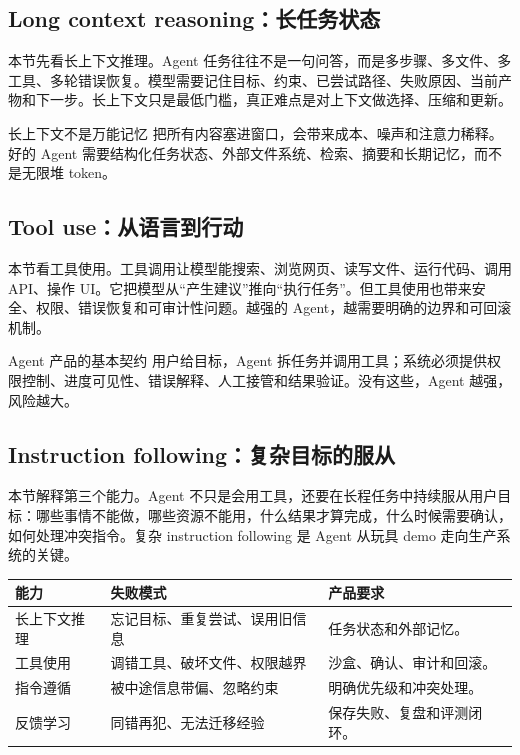 \documentclass[a4paper]{article}
\begin{document}
\subsection{Long context reasoning：长任务状态}

本节先看长上下文推理。Agent 任务往往不是一句问答，而是多步骤、多文件、多工具、多轮错误恢复。模型需要记住目标、约束、已尝试路径、失败原因、当前产物和下一步。长上下文只是最低门槛，真正难点是对上下文做选择、压缩和更新。

\begin{warningbox}{长上下文不是万能记忆}
把所有内容塞进窗口，会带来成本、噪声和注意力稀释。好的 Agent 需要结构化任务状态、外部文件系统、检索、摘要和长期记忆，而不是无限堆 token。
\end{warningbox}

\subsection{Tool use：从语言到行动}

本节看工具使用。工具调用让模型能搜索、浏览网页、读写文件、运行代码、调用 API、操作 UI。它把模型从“产生建议”推向“执行任务”。但工具使用也带来安全、权限、错误恢复和可审计性问题。越强的 Agent，越需要明确的边界和可回滚机制。

\begin{importantbox}{Agent 产品的基本契约}
用户给目标，Agent 拆任务并调用工具；系统必须提供权限控制、进度可见性、错误解释、人工接管和结果验证。没有这些，Agent 越强，风险越大。
\end{importantbox}

\subsection{Instruction following：复杂目标的服从}

本节解释第三个能力。Agent 不只是会用工具，还要在长程任务中持续服从用户目标：哪些事情不能做，哪些资源不能用，什么结果才算完成，什么时候需要确认，如何处理冲突指令。复杂 instruction following 是 Agent 从玩具 demo 走向生产系统的关键。

\noindent\begin{tabularx}{\textwidth}{p{}p{}X}
\toprule
能力 & 失败模式 & 产品要求 \\
\midrule
长上下文推理 & 忘记目标、重复尝试、误用旧信息 & 任务状态和外部记忆。 \\
工具使用 & 调错工具、破坏文件、权限越界 & 沙盒、确认、审计和回滚。 \\
指令遵循 & 被中途信息带偏、忽略约束 & 明确优先级和冲突处理。 \\
反馈学习 & 同错再犯、无法迁移经验 & 保存失败、复盘和评测闭环。 \\
\bottomrule
\end{tabularx}
\end{document}
